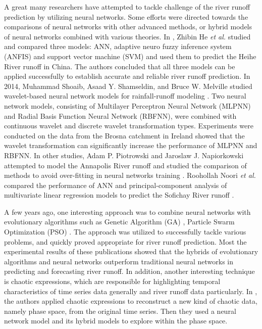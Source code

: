 A great many researchers have attempted to tackle challenge of the river runoff prediction by utilizing neural networks. Some efforts were directed towards the comparisons of neural networks with other advanced methods, or hybrid models of neural networks combined with various theories. In \cite{ANN:ref_64}, Zhibin He \textit{et al.} studied and compared three models: ANN, adaptive neuro fuzzy inference system (ANFIS) and support vector machine (SVM) and used them to predict the Heihe River runoff in China. The authors concluded that all three models can be applied successfully to establish accurate and reliable river runoff prediction. In 2014, Muhammad Shoaib, Asaad Y. Shamseldin, and Bruce W. Melville studied wavelet-based neural network models for rainfall-runoff modeling \cite{ANN:ref_91}. Two neural network models, consisting of Multilayer Perceptron Neural Network (MLPNN) and Radial Basis Function Neural Network (RBFNN), were combined with continuous wavelet and discrete wavelet transformation types. Experiments were conducted on the data from the Brosna catchment in Ireland showed that the wavelet transformation can significantly increase the performance of MLPNN and RBFNN. In other studies, Adam P. Piotrowski and Jaroslaw J. Napiorkowski attempted to model the Annapolis River runoff and studied the comparison of methods to avoid over-fitting in neural networks training \cite{ANN:ref_72}. Roohollah Noori \textit{et al.} compared the performance of ANN and principal-component analysis of multivariate linear regression models to predict the Sofichay River runoff \cite{ANN:ref_89}.

A few years ago, one interesting approach was to combine neural networks with evolutionary algorithms such as Genetic Algorithm (GA) \cite{ANN:ref_67}, Particle Swarm Optimization (PSO) \cite{ANN:ref_79, ANN:ref_78, ANN:ref_90}. The approach was utilized to successfully tackle various problems, and quickly proved appropriate for river runoff prediction. Most the experimental results of these publications showed that the hybrids of evolutionary algorithms and neural networks outperform traditional neural networks in predicting and forecasting river runoff. In addition, another interesting technique is chaotic expressions, which are responsible for highlighting temporal characteristics of time series data generally and river runoff data particularly. In \cite{ANN:ref_05, ANN:ref_07, ANN:ref_17}, the authors applied chaotic expressions to reconstruct a new kind of chaotic data, namely phase space, from the original time series. Then they used a neural network model and its hybrid models to explore within the phase space. 

